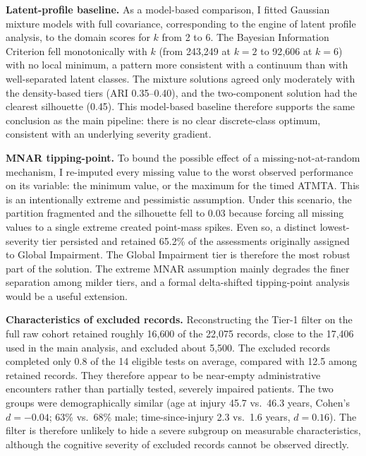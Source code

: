 \textbf{Latent-profile baseline.} As a model-based comparison, I fitted Gaussian mixture models with full covariance, corresponding to the engine of latent profile analysis, to the domain scores for $k$ from 2 to 6. The Bayesian Information Criterion fell monotonically with $k$ (from 243{,}249 at $k=2$ to 92{,}606 at $k=6$) with no local minimum, a pattern more consistent with a continuum than with well-separated latent classes. The mixture solutions agreed only moderately with the density-based tiers (ARI 0.35--0.40), and the two-component solution had the clearest silhouette (0.45). This model-based baseline therefore supports the same conclusion as the main pipeline: there is no clear discrete-class optimum, consistent with an underlying severity gradient.

\textbf{MNAR tipping-point.} To bound the possible effect of a missing-not-at-random mechanism, I re-imputed every missing value to the worst observed performance on its variable: the minimum value, or the maximum for the timed ATMTA. This is an intentionally extreme and pessimistic assumption. Under this scenario, the partition fragmented and the silhouette fell to 0.03 because forcing all missing values to a single extreme created point-mass spikes. Even so, a distinct lowest-severity tier persisted and retained 65.2\% of the assessments originally assigned to Global Impairment. The Global Impairment tier is therefore the most robust part of the solution. The extreme MNAR assumption mainly degrades the finer separation among milder tiers, and a formal delta-shifted tipping-point analysis would be a useful extension.

\textbf{Characteristics of excluded records.} Reconstructing the Tier-1 filter on the full raw cohort retained roughly 16{,}600 of the 22{,}075 records, close to the 17{,}406 used in the main analysis, and excluded about 5{,}500. The excluded records completed only 0.8 of the 14 eligible tests on average, compared with 12.5 among retained records. They therefore appear to be near-empty administrative encounters rather than partially tested, severely impaired patients. The two groups were demographically similar (age at injury 45.7 vs.\ 46.3 years, Cohen's $d = -0.04$; 63\% vs.\ 68\% male; time-since-injury 2.3 vs.\ 1.6 years, $d = 0.16$). The filter is therefore unlikely to hide a severe subgroup on measurable characteristics, although the cognitive severity of excluded records cannot be observed directly.

\clearpage


